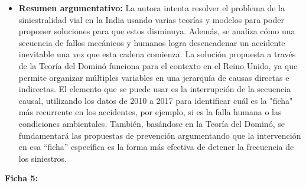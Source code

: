 \documentclass[12pt]{article}
\begin{document}
\begin{itemize}
	\item \textbf{Resumen argumentativo:} La autora intenta resolver el problema de la siniestralidad vial en la India usando varias teorías y modelos para poder proponer soluciones para que estos disminuya. Además,  se analiza cómo una secuencia de fallos mecánicos y humanos logra desencadenar un accidente inevitable una vez que esta cadena comienza. La solución propuesta a través de la Teoría del Dominó funciona para el contexto en el Reino Unido, ya que permite organizar múltiples variables en una jerarquía de causas directas e indirectas. El elemento que se puede usar es la interrupción de la secuencia causal, utilizando los datos de 2010 a 2017 para identificar cuál es la "ficha" más recurrente en los accidentes, por ejemplo, si es la falla humana o las condiciones ambientales. También, basándose en la Teoría del Dominó, se fundamentará las propuestas de prevención argumentando que la intervención en esa “ficha” específica es la forma más efectiva de detener la frecuencia de los siniestros.
	\end{itemize}
	
\textbf{Ficha 5:}
\end{document}
